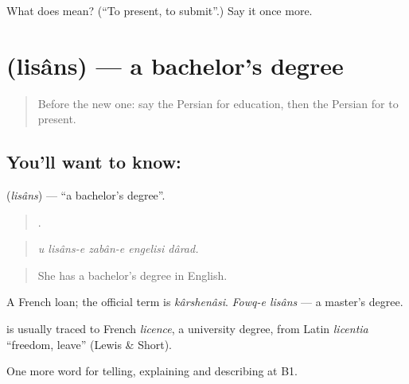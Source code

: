 \begin{tcolorbox}[breakable,colback=teal!4,colframe=teal!35!black,title={Before you move on}]
What does   mean? (\textquotedblleft{}To present, to submit\textquotedblright{}.) Say it once more.
\end{tcolorbox}
\section[\texorpdfstring{\fa{لیسانس} (lisâns)}{لیسانس (lisâns)}]{ (lisâns) — a bachelor's degree}

\label{lesson:FA-C403-lisans}



\begin{quote}
Before the new one: say the Persian for education, then the Persian for to present.
\end{quote}

\subsection*{You'll want to know: }
\textbf{} (\emph{lisâns}) — \textquotedblleft{}a bachelor's degree\textquotedblright{}.

\begin{quote}
    .
\end{quote}

\begin{quote}
\emph{u lisâns-e zabân-e engelisi dârad.}
\end{quote}

\begin{quote}
She has a bachelor's degree in English.
\end{quote}

A French loan; the official term is \emph{kârshenâsi}. \emph{Fowq-e lisâns} — a master's degree.

\begin{cousinweb}
\textbf{} is usually traced to French \emph{licence}, a university degree, from Latin \emph{licentia} \textquotedblleft{}freedom, leave\textquotedblright{} (Lewis \& Short).
\end{cousinweb}

\begin{grammarlens}[title={What you've built}]
One more word for telling, explaining and describing at B1.
\end{grammarlens}

